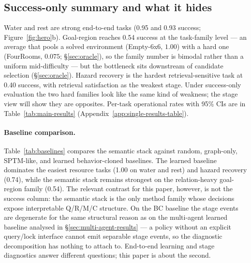 \documentclass{article}
\begin{document}
\subsection{Success-only summary and what it hides}
\label{sec:single-results}

Water and rest are strong end-to-end tasks (0.95 and 0.93 success; Figure~\ref{fig:hero}b). Goal-region reaches 0.54 success at the task-family level --- an average that pools a solved environment (Empty-6x6, $1.00$) with a hard one (FourRooms, $0.075$; \S\ref{sec:oracle}), so the family number is bimodal rather than a uniform mid-difficulty --- but the bottleneck sits downstream of candidate selection (\S\ref{sec:oracle}). Hazard recovery is the hardest retrieval-sensitive task at 0.40 success, with retrieval satisfaction as the weakest stage. Under success-only evaluation the two hard families look like the same kind of weakness; the stage view will show they are opposites. Per-task operational rates with 95\% CIs are in Table~\ref{tab:main-results} (Appendix~\ref{app:single-results-table}).

\paragraph{Baseline comparison.}
Table~\ref{tab:baselines} compares the semantic stack against random,
graph-only, SPTM-like, and learned behavior-cloned baselines. The
learned baseline dominates the easiest resource tasks (1.00 on water
and rest) and hazard recovery (0.74), while the semantic stack remains
strongest on the relation-heavy goal-region family (0.54). The
relevant contrast for this paper, however, is not the success column:
the semantic stack is the only method family whose decisions expose
interpretable Q/R/M/C structure. On the BC baseline the stage events
are degenerate for the same structural reason as on the multi-agent
learned baseline analysed in \S\ref{sec:multi-agent-results} --- a
policy without an explicit query/lock interface cannot emit separable
stage events, so the diagnostic decomposition has nothing to attach
to. End-to-end learning and stage diagnostics answer different
questions; this paper is about the second.
\end{document}
